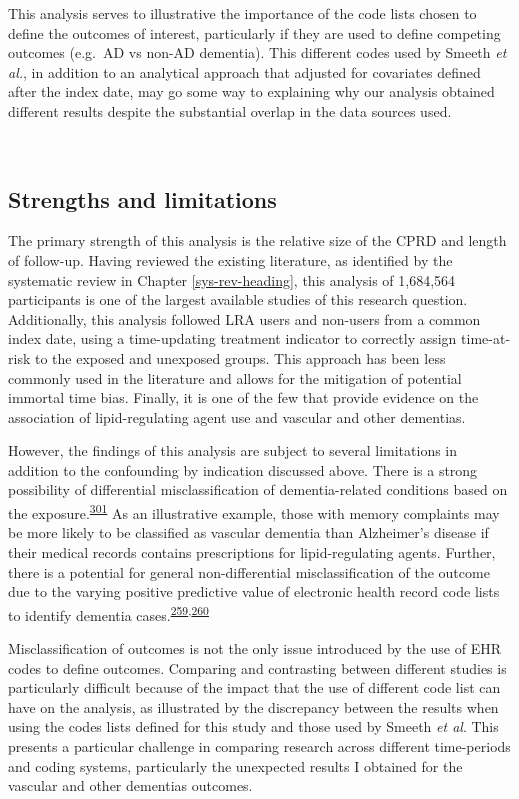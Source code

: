 \documentclass[a4paper, twoside]{templates/ociamthesis}
\begin{document}
This analysis serves to illustrative the importance of the code lists chosen to define the outcomes of interest, particularly if they are used to define competing outcomes (e.g.~AD vs non-AD dementia). This different codes used by Smeeth \emph{et al.}, in addition to an analytical approach that adjusted for covariates defined after the index date, may go some way to explaining why our analysis obtained different results despite the substantial overlap in the data sources used.

~

\hypertarget{strengths-and-limitations-1}{%
\subsection{Strengths and limitations}\label{strengths-and-limitations-1}}

The primary strength of this analysis is the relative size of the CPRD and length of follow-up. Having reviewed the existing literature, as identified by the systematic review in Chapter \ref{sys-rev-heading}, this analysis of 1,684,564 participants is one of the largest available studies of this research question. Additionally, this analysis followed LRA users and non-users from a common index date, using a time-updating treatment indicator to correctly assign time-at-risk to the exposed and unexposed groups. This approach has been less commonly used in the literature and allows for the mitigation of potential immortal time bias. Finally, it is one of the few that provide evidence on the association of lipid-regulating agent use and vascular and other dementias.

However, the findings of this analysis are subject to several limitations in addition to the confounding by indication discussed above. There is a strong possibility of differential misclassification of dementia-related conditions based on the exposure.\textsuperscript{\protect\hyperlink{ref-porta2014dictionary}{301}} As an illustrative example, those with memory complaints may be more likely to be classified as vascular dementia than Alzheimer's disease if their medical records contains prescriptions for lipid-regulating agents. Further, there is a potential for general non-differential misclassification of the outcome due to the varying positive predictive value of electronic health record code lists to identify dementia cases.\textsuperscript{\protect\hyperlink{ref-mcguinness2019validity}{259},\protect\hyperlink{ref-wilkinson2018}{260}}

Misclassification of outcomes is not the only issue introduced by the use of EHR codes to define outcomes. Comparing and contrasting between different studies is particularly difficult because of the impact that the use of different code list can have on the analysis, as illustrated by the discrepancy between the results when using the codes lists defined for this study and those used by Smeeth \emph{et al}. This presents a particular challenge in comparing research across different time-periods and coding systems, particularly the unexpected results I obtained for the vascular and other dementias outcomes.
\end{document}
